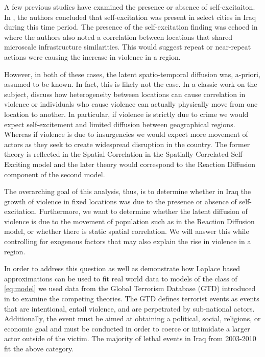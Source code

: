 \documentclass[11pt]{isuthesis}
\begin{document}
A few previous studies have examined the presence or absence of self-excitaiton.  In \cite{lewis2012self}, the authors concluded that self-excitation was present in select cities in Iraq during this time period.  The presence of the self-excitation finding was echoed in \cite{braithwaite2015battle} where the authors also noted a correlation between locations that shared microscale infrastructure similarities.  This would suggest repeat or near-repeat actions were causing the increase in violence in a region.

However, in both of these cases, the latent spatio-temporal diffusion was, a-priori, assumed to be known.  In fact, this is likely not the case. In a classic work on the subject, \cite{midlarsky1980violence} discuss how heterogeneity between locations can cause correlation in violence or individuals who cause violence can actually physically move from one location to another.  In particular, if violence is strictly due to crime we would expect self-excitement and limited diffusion between geographical regions.  Whereas if violence is due to insurgencies we would expect more movement of actors as they seek to create widespread disruption in the country.
The former theory is reflected in the Spatial Correlation in the Spatially Correlated Self-Exciting model and the later theory would correspond to the Reaction Diffusion component of the second model.  

The overarching goal of this analysis, thus, is to determine whether in Iraq the growth of violence in fixed locations was due to the presence or absence of self-excitation.  Furthermore, we want to determine whether the latent diffusion of violence is due to the movement of population such as in the Reaction Diffusion model, or whether there is static spatial correlation.  We will answer this while controlling for exogenous factors that may also explain the rise in violence in a region.


In order to address this question as well as demonstrate how Laplace based approximations can be used to fit real world data to models of the class of \eqref{eq:model} we used data from the Global Terrorism Database (GTD) introduced in \cite{lafree2007introducing} to examine the competing theories.  The GTD defines terrorist events as events that are intentional, entail violence, and are perpetrated by sub-national actors.  Additionally, the event must be aimed at obtaining a political, social, religions, or economic goal and must be conducted in order to coerce or intimidate a larger actor outside of the victim.  The majority of lethal events in Iraq from 2003-2010 fit the above category.
\end{document}
